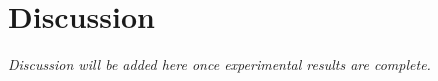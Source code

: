 \documentclass[../main.tex]{subfiles}
\begin{document}
\section{Discussion}
\justify

\textit{Discussion will be added here once experimental results are complete.}
\end{document}
